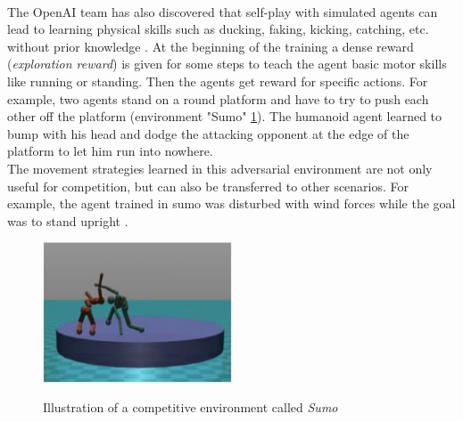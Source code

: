 \\
The OpenAI team has also discovered that self-play with simulated agents can lead to learning physical skills such as ducking, faking, kicking, catching, etc. without prior knowledge \cite{environmentBansal2017Oct}. At the beginning of the training a dense reward (\textit{exploration reward}) is given for some steps to teach the agent basic motor skills like running or standing. Then the agents get reward for specific actions. For example, two agents stand on a round platform and have to try to push each other off the platform (environment "Sumo" \ref{fig:sumo}). The humanoid agent learned to bump with his head and dodge the attacking opponent at the edge of the platform to let him run into nowhere. \\
The movement strategies learned in this adversarial environment are not only useful for competition, but can also be transferred to other scenarios. For example, the agent trained in sumo was disturbed with wind forces while the goal was to stand upright \cite{environmentBansal2017Oct}.
\begin{figure}[H]
  \centering
    \includegraphics[width=0.5\textwidth]{adversarial_learning/images/sumo.JPG}
    \label{fig:sumo}
    \caption{Illustration of a competitive environment called \textit{Sumo} \cite{environmentBansal2017Oct}}
\end{figure}




